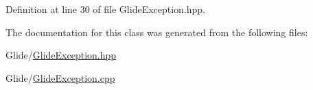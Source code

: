Definition at line 30 of file Glide\-Exception.\-hpp.



The documentation for this class was generated from the following files\-:\begin{DoxyCompactItemize}
\item 
Glide/\hyperlink{_glide_exception_8hpp}{Glide\-Exception.\-hpp}\item 
Glide/\hyperlink{_glide_exception_8cpp}{Glide\-Exception.\-cpp}\end{DoxyCompactItemize}
